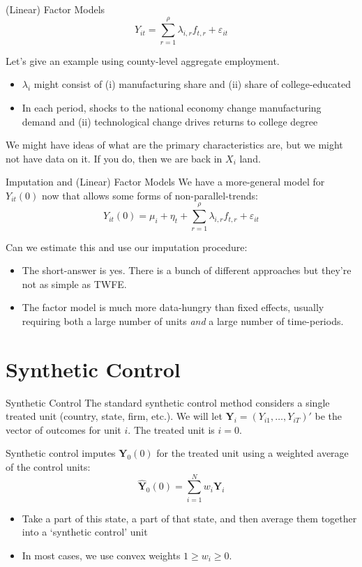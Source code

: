 \documentclass[t]{beamer}
\begin{document}
\begin{frame}{(Linear) Factor Models}
  $$
    Y_{it} = \sum_{r=1}^\rho \lambda_{i, r} f_{t, r} + \varepsilon_{it}
  $$

  \bigskip
  Let's give an example using county-level aggregate employment. 
  \begin{itemize}
    \item $\lambda_i$ might consist of (i) manufacturing share and (ii) share of college-educated
    \item In each period, shocks to the national economy change manufacturing demand and (ii) technological change drives returns to college degree 
  \end{itemize}

  \pause
  \bigskip 
  We might have ideas of what are the primary characteristics are, but we might not have data on it. If you do, then we are back in $X_i$ land.
\end{frame}

\begin{frame}{Imputation and (Linear) Factor Models}
  We have a more-general model for $Y_{it}(0)$ now that allows some forms of non-parallel-trends:
  $$
    Y_{it}(0) =  \mu_i + \eta_t + \sum_{r=1}^\rho \lambda_{i, r} f_{t, r} + \varepsilon_{it}
  $$

  \bigskip\bigskip
  Can we estimate this and use our imputation procedure:
  \begin{itemize}
    \item The short-answer is yes. There is a bunch of different approaches but they're not as simple as TWFE. 

    \item The factor model is much more data-hungry than fixed effects, usually requiring both a large number of units \emph{ and } a large number of time-periods.
  \end{itemize}
\end{frame}





\section{Synthetic Control}

\begin{frame}{Synthetic Control}
  The standard synthetic control method considers a single treated unit (country, state, firm, etc.). We will let $\bm{Y}_i = \left( Y_{i1}, \dots, Y_{iT} \right)'$ be the vector of outcomes for unit $i$. The treated unit is $i = 0$. 

  \bigskip\pause
  Synthetic control imputes $\bm{Y}_0(0)$ for the treated unit using a weighted average of the control units: 
  $$
    \hat{\bm{Y}}_0(0) = \sum_{i = 1}^N w_i \bm{Y}_i
  $$
  \begin{itemize}
    \item Take a part of this state, a part of that state, and then average them together into a `synthetic control' unit
    \item In most cases, we use convex weights $1 \geq w_i \geq 0$.
  \end{itemize}
\end{frame}
\end{document}
